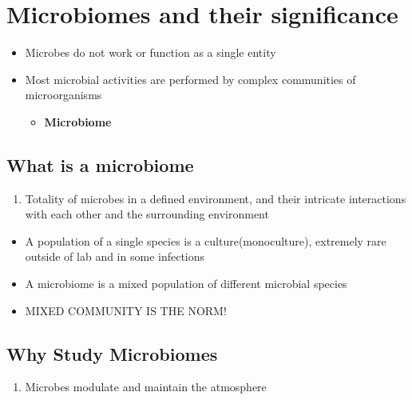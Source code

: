 \documentclass[
]{book}
\providecommand{\tightlist}{%
  \setlength{\itemsep}{0pt}\setlength{\parskip}{0pt}}
\begin{document}
\hypertarget{microbiomes-and-their-significance}{%
\section{Microbiomes and their significance}\label{microbiomes-and-their-significance}}

\begin{itemize}
\tightlist
\item
  Microbes do not work or function as a single entity
\item
  Most microbial activities are performed by complex communities of microorganisms

  \begin{itemize}
  \tightlist
  \item
    \textbf{Microbiome}
  \end{itemize}
\end{itemize}

\hypertarget{what-is-a-microbiome}{%
\subsection{What is a microbiome}\label{what-is-a-microbiome}}

\begin{enumerate}
\def\labelenumi{\arabic{enumi}.}
\tightlist
\item
  Totality of microbes in a defined environment, and their intricate interactions with each other and the surrounding environment
\end{enumerate}

\begin{itemize}
\tightlist
\item
  A population of a single species is a culture(monoculture), extremely rare outside of lab and in some infections
\item
  A microbiome is a mixed population of different microbial species
\item
  MIXED COMMUNITY IS THE NORM!
\end{itemize}

\hypertarget{why-study-microbiomes}{%
\subsection{Why Study Microbiomes}\label{why-study-microbiomes}}

\begin{enumerate}
\def\labelenumi{\arabic{enumi}.}
\tightlist
\item
  Microbes modulate and maintain the atmosphere
\end{enumerate}
\end{document}
